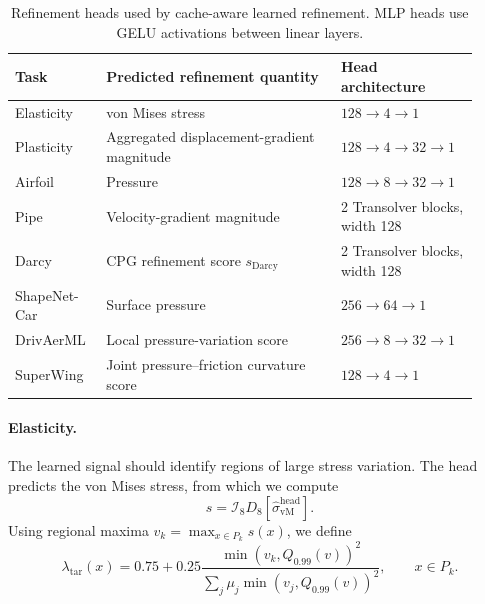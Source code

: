 \documentclass{article}
\providecommand{\DIFaddbeginFL}{} %
\providecommand{\DIFaddendFL}{} %
\providecommand{\DIFdelbeginFL}{} %
\providecommand{\DIFdelendFL}{} %
\newcommand{\DIFscaledelfig}{0.5}
\newlength{\DIFdelgraphicswidth} %
\newlength{\DIFdelgraphicsheight} %
\newcommand{\DIFaddincludegraphics}[2][]{{\color{blue}\fbox{\DIFOincludegraphics[#1]{#2}}}} %
\newcommand{\DIFdelincludegraphics}[2][]{%
\sbox{\DIFdelgraphicsbox}{\DIFOincludegraphics[#1]{#2}}%
\settoboxwidth{\DIFdelgraphicswidth}{\DIFdelgraphicsbox} %
\settoboxtotalheight{\DIFdelgraphicsheight}{\DIFdelgraphicsbox} %
\scalebox{\DIFscaledelfig}{%
\parbox[b]{\DIFdelgraphicswidth}{\usebox{\DIFdelgraphicsbox}\\[-\baselineskip] \rule{\DIFdelgraphicswidth}{0em}}\llap{\resizebox{\DIFdelgraphicswidth}{\DIFdelgraphicsheight}{%
\setlength{\unitlength}{\DIFdelgraphicswidth}%
\begin{picture}(1,1)%
\thicklines\linethickness{2pt} %
{\color[rgb]{1,0,0}\put(0,0){\framebox(1,1){}}}%
{\color[rgb]{1,0,0}\put(0,0){\line( 1,1){1}}}%
{\color[rgb]{1,0,0}\put(0,1){\line(1,-1){1}}}%
\end{picture}%
}\hspace*{3pt}}} %
} %
\DeclareRobustCommand{\DIFaddbeginFL}{\DIFOaddbeginFL \let\includegraphics\DIFaddincludegraphics} %
\DeclareRobustCommand{\DIFaddendFL}{\DIFOaddendFL \let\includegraphics\DIFOincludegraphics} %
\DeclareRobustCommand{\DIFdelbeginFL}{\DIFOdelbeginFL \let\includegraphics\DIFdelincludegraphics} %
\DeclareRobustCommand{\DIFdelendFL}{\DIFOaddendFL \let\includegraphics\DIFOincludegraphics} %
\renewcommand{\DIFaddincludegraphics}[2][]{%
  \begingroup
  \sbox{\DIFdelgraphicsbox}{\DIFOincludegraphics[#1]{#2}}%
  \setlength{\fboxsep}{0pt}\setlength{\fboxrule}{0.8pt}%
  {\color{blue}\fbox{\resizebox{\dimexpr\wd\DIFdelgraphicsbox-2\fboxrule\relax}{!}{\usebox{\DIFdelgraphicsbox}}}}%
  \endgroup
}
\begin{document}
\begin{table}[t]
\centering
\caption{Refinement heads used by cache-aware learned refinement. MLP heads use
GELU activations between linear layers.}
\label{tab:ca_head_architectures}
\small
\DIFdelbeginFL %
\DIFdelendFL \DIFaddbeginFL \DIFaddendFL \begin{tabular}{@{}p{0.18\linewidth}p{0.47\linewidth}p{0.27\linewidth}@{}}
\toprule
Task & Predicted refinement quantity & Head architecture \\
\midrule
Elasticity
& von Mises stress
& $128\!\to\!4\!\to\!1$ \\

Plasticity
& Aggregated displacement-gradient magnitude
& $128\!\to\!4\!\to\!32\!\to\!1$ \\

Airfoil
& Pressure
& $128\!\to\!8\!\to\!32\!\to\!1$ \\

Pipe
& Velocity-gradient magnitude
& 2 Transolver blocks, width 128 \\

Darcy
& CPG refinement score $s_{\mathrm{Darcy}}$
& 2 Transolver blocks, width 128 \\

ShapeNet-Car
& Surface pressure
& $256\!\to\!64\!\to\!1$ \\

DrivAerML
& Local pressure-variation score
& $256\!\to\!8\!\to\!32\!\to\!1$ \\

SuperWing
& Joint pressure--friction curvature score
& $128\!\to\!4\!\to\!1$ \\
\bottomrule
\end{tabular}
\end{table}

\paragraph{Elasticity.}
The learned signal should identify regions of large stress variation. The head
predicts the von Mises stress, from which we compute
\[
    s
    =\mathcal{I}_8D_8[
        \widehat{\sigma}_{\mathrm{vM}}^{\mathrm{head}}
    ].
\]
Using regional maxima
$v_k=\max_{x\in P_k}s(x)$, we define
\begin{equation}
    \lambda_{\mathrm{tar}}(x)
    =0.75+0.25
      \frac{\min(v_k,Q_{0.99}(v))^2}{\sum_j\mu_j\min(v_j,Q_{0.99}(v))^2},
    \qquad x\in P_k.
    \label{eq:app_density_elasticity_ca}
\end{equation}
\end{document}
